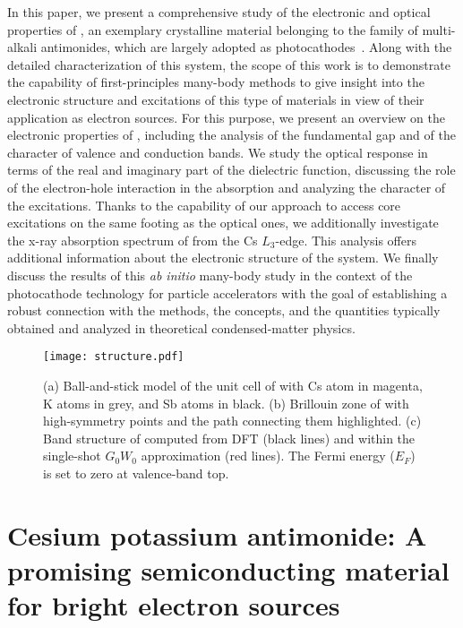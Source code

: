\documentclass[aps,pra,superscriptaddress,twocolumn]{revtex4}
\begin{document}
In this paper, we present a comprehensive study of the electronic and optical properties of , an exemplary crystalline material belonging to the family of multi-alkali antimonides, which are largely adopted as photocathodes~\cite{smed+09aipcp,schu+13aplm,musu+18nimpra}.
Along with the detailed characterization of this system, the scope of this work is to demonstrate the capability of first-principles many-body methods to give insight into the electronic structure and excitations of this type of materials in view of their application as electron sources.
For this purpose, we present an overview on the electronic properties of , including the analysis of the fundamental gap and of the character of valence and conduction bands.
We study the optical response in terms of the real and imaginary part of the dielectric function, discussing the role of the electron-hole interaction in the absorption and analyzing the character of the excitations.
Thanks to the capability of our approach to access core excitations on the same footing as the optical ones, we additionally investigate the x-ray absorption spectrum of  from the Cs $L_3$-edge. 
This analysis offers additional information about the electronic structure of the system.
We finally discuss the results of this \textit{ab initio} many-body study in the context of the photocathode technology for particle accelerators with the goal of establishing a robust connection with the methods, the concepts, and the quantities typically obtained and analyzed in theoretical condensed-matter physics. 

%
\begin{figure}
\texttt{[image: structure.pdf]}
\caption{(a) Ball-and-stick model of the unit cell of  with Cs atom in magenta, K atoms in grey, and Sb atoms in black. (b) Brillouin zone of  with high-symmetry points and the path connecting them highlighted. (c) Band structure of  computed from DFT (black lines) and within the single-shot $G_0W_0$ approximation (red lines). The Fermi energy ($E_F$) is set to zero at valence-band top.}
\label{fig:structure}
\end{figure} 
%

\section{Cesium potassium antimonide: A promising semiconducting material for bright electron sources}
\label{section:system}
\end{document}

